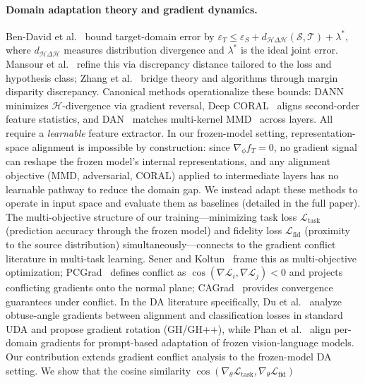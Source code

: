 \paragraph{Domain adaptation theory and gradient dynamics.}
Ben-David et al.~\cite{bendavid2010} bound target-domain error by
$\varepsilon_T \leq \varepsilon_S + d_{\mathcal{H}\Delta\mathcal{H}}(\mathcal{S}, \mathcal{T}) + \lambda^*$,
where $d_{\mathcal{H}\Delta\mathcal{H}}$ measures distribution divergence and $\lambda^*$
is the ideal joint error.
Mansour et al.~\cite{mansour2009} refine this via discrepancy distance tailored to the
loss and hypothesis class; Zhang et al.~\cite{zhang2019mdd} bridge theory and algorithms
through margin disparity discrepancy.
Canonical methods operationalize these bounds:
DANN~\cite{ganin2016dann} minimizes $\mathcal{H}$-divergence via gradient reversal,
Deep CORAL~\cite{sun2016coral} aligns second-order feature statistics,
and DAN~\cite{long2015dan} matches multi-kernel MMD~\cite{gretton2012mmd} across layers.
All require a \emph{learnable} feature extractor.
In our frozen-model setting, representation-space alignment is impossible by construction: since $\nabla_\phi f_T = 0$, no gradient signal can reshape the frozen model's internal representations, and any alignment objective (MMD, adversarial, CORAL) applied to intermediate layers has no learnable pathway to reduce the domain gap.
We instead adapt these methods to operate in input space and evaluate them as baselines (detailed in the full paper).
%
The multi-objective structure of our training---minimizing task loss $\mathcal{L}_\text{task}$
(prediction accuracy through the frozen model) and fidelity loss $\mathcal{L}_\text{fid}$
(proximity to the source distribution) simultaneously---connects to the gradient conflict
literature in multi-task learning.
Sener and Koltun~\cite{sener2018moo} frame this as multi-objective optimization;
PCGrad~\cite{yu2020pcgrad} defines conflict as $\cos(\nabla\mathcal{L}_i, \nabla\mathcal{L}_j) < 0$
and projects conflicting gradients onto the normal plane;
CAGrad~\cite{liu2021cagrad} provides convergence guarantees under conflict.
In the DA literature specifically,
Du et al.~\cite{du2024gh} analyze obtuse-angle gradients between alignment and classification
losses in standard UDA and propose gradient rotation (GH/GH++),
while Phan et al.~\cite{phan2024pga} align per-domain gradients for prompt-based adaptation
of frozen vision-language models.
Our contribution extends gradient conflict analysis to the frozen-model DA setting.
We show that the cosine similarity
$\cos(\nabla_\theta\mathcal{L}_\text{task}, \nabla_\theta\mathcal{L}_\text{fid})$
